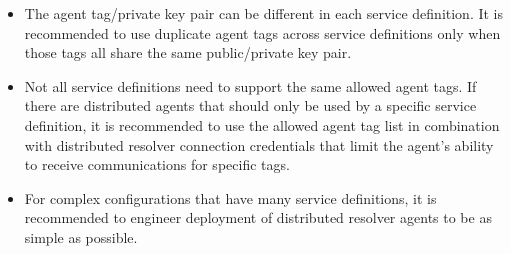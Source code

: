 \begin{itemize}
  \item The agent tag/private key pair can be different in each service definition.  It is recommended to
  use duplicate agent tags across service definitions only when those tags all share the same public/private
  key pair.

  \item Not all service definitions need to support the same allowed agent tags.  If there are distributed agents
  that should only be used by a specific service definition, it is recommended to use the allowed agent tag list
  in combination with distributed resolver connection credentials that limit the agent's ability to receive
  communications for specific tags.

  \item For complex \cxoneflow configurations that have many service definitions, it is recommended to engineer
  deployment of distributed resolver agents to be as simple as possible.
    
\end{itemize}


